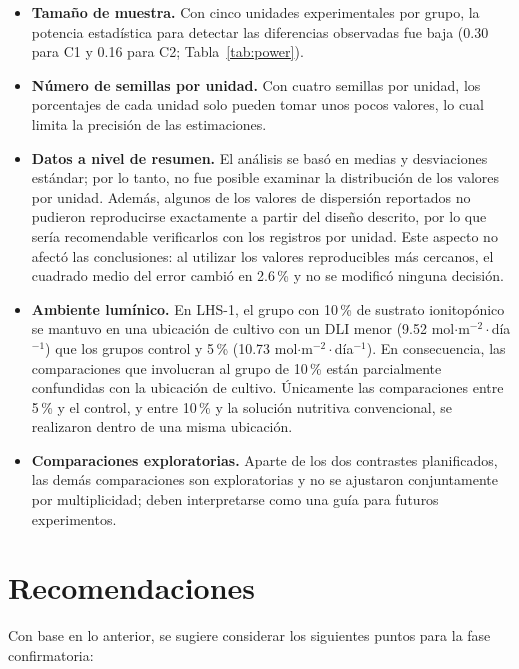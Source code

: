 \documentclass[11pt]{article}
\begin{document}
\begin{itemize}[leftmargin=1.4em,itemsep=2pt]
\item \textbf{Tamaño de muestra.} Con cinco unidades experimentales por grupo, la potencia estadística para detectar las diferencias observadas fue baja (0.30 para C1 y 0.16 para C2; Tabla~\ref{tab:power}).
\item \textbf{Número de semillas por unidad.} Con cuatro semillas por unidad, los porcentajes de cada unidad solo pueden tomar unos pocos valores, lo cual limita la precisión de las estimaciones.
\item \textbf{Datos a nivel de resumen.} El análisis se basó en medias y desviaciones estándar; por lo tanto, no fue posible examinar la distribución de los valores por unidad. Además, algunos de los valores de dispersión reportados no pudieron reproducirse exactamente a partir del diseño descrito, por lo que sería recomendable verificarlos con los registros por unidad. Este aspecto no afectó las conclusiones: al utilizar los valores reproducibles más cercanos, el cuadrado medio del error cambió en 2.6\,\% y no se modificó ninguna decisión.
\item \textbf{Ambiente lumínico.} En LHS-1, el grupo con 10\,\% de sustrato ionitopónico se mantuvo en una ubicación de cultivo con un DLI menor (9.52 mol$\cdot$m$^{-2}\cdot$día$^{-1}$) que los grupos control y 5\,\% (10.73 mol$\cdot$m$^{-2}\cdot$día$^{-1}$). En consecuencia, las comparaciones que involucran al grupo de 10\,\% están parcialmente confundidas con la ubicación de cultivo. Únicamente las comparaciones entre 5\,\% y el control, y entre 10\,\% y la solución nutritiva convencional, se realizaron dentro de una misma ubicación.
\item \textbf{Comparaciones exploratorias.} Aparte de los dos contrastes planificados, las demás comparaciones son exploratorias y no se ajustaron conjuntamente por multiplicidad; deben interpretarse como una guía para futuros experimentos.
\end{itemize}

\section{Recomendaciones}

Con base en lo anterior, se sugiere considerar los siguientes puntos para la fase confirmatoria:
\end{document}
